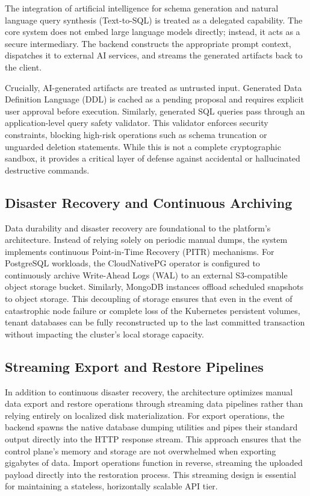 The integration of artificial intelligence for schema generation and natural language query synthesis (Text-to-SQL) is treated as a delegated capability. The core system does not embed large language models directly; instead, it acts as a secure intermediary. The backend constructs the appropriate prompt context, dispatches it to external AI services, and streams the generated artifacts back to the client.

Crucially, AI-generated artifacts are treated as untrusted input. Generated Data Definition Language (DDL) is cached as a pending proposal and requires explicit user approval before execution. Similarly, generated SQL queries pass through an application-level query safety validator. This validator enforces security constraints, blocking high-risk operations such as schema truncation or unguarded deletion statements. While this is not a complete cryptographic sandbox, it provides a critical layer of defense against accidental or hallucinated destructive commands.

\subsection{Disaster Recovery and Continuous Archiving}

Data durability and disaster recovery are foundational to the platform's architecture. Instead of relying solely on periodic manual dumps, the system implements continuous Point-in-Time Recovery (PITR) mechanisms. For PostgreSQL workloads, the CloudNativePG operator is configured to continuously archive Write-Ahead Logs (WAL) to an external S3-compatible object storage bucket. Similarly, MongoDB instances offload scheduled snapshots to object storage. This decoupling of storage ensures that even in the event of catastrophic node failure or complete loss of the Kubernetes persistent volumes, tenant databases can be fully reconstructed up to the last committed transaction without impacting the cluster's local storage capacity.

\subsection{Streaming Export and Restore Pipelines}

In addition to continuous disaster recovery, the architecture optimizes manual data export and restore operations through streaming data pipelines rather than relying entirely on localized disk materialization. For export operations, the backend spawns the native database dumping utilities and pipes their standard output directly into the HTTP response stream. This approach ensures that the control plane's memory and storage are not overwhelmed when exporting gigabytes of data. Import operations function in reverse, streaming the uploaded payload directly into the restoration process. This streaming design is essential for maintaining a stateless, horizontally scalable API tier.
